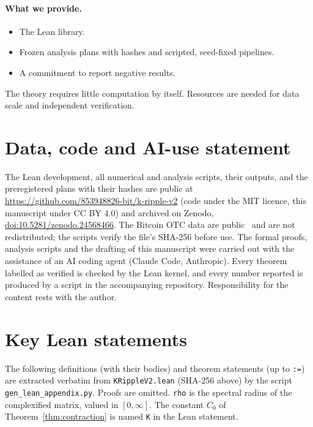 \documentclass[11pt]{article}
\theoremstyle{definition}
\theoremstyle{remark}
\begin{document}
\paragraph{What we provide.}
\begin{itemize}
\item The Lean library.
\item Frozen analysis plans with hashes and scripted, seed-fixed pipelines.
\item A commitment to report negative results.
\end{itemize}
The theory requires little computation by itself. Resources are needed for data scale and independent
verification.

\section*{Data, code and AI-use statement}
The Lean development, all numerical and analysis scripts, their outputs, and the preregistered plans
with their hashes are public at \url{https://github.com/853948826-bit/k-ripple-v2} (code under the MIT
licence, this manuscript under CC BY 4.0) and archived on Zenodo, \href{https://doi.org/10.5281/zenodo.24568466}{doi:10.5281/zenodo.24568466}.
The Bitcoin OTC data are public~\cite{snap} and are not redistributed; the scripts verify the file's
SHA-256 before use. The formal proofs, analysis scripts and the drafting of this
manuscript were carried out with the assistance of an AI coding agent (Claude Code, Anthropic). Every
theorem labelled as verified is checked by the Lean kernel, and every number reported is produced by a
script in the accompanying repository. Responsibility for the content rests with the author.

\appendix
\section{Key Lean statements}\label{app:lean}
The following definitions (with their bodies) and theorem statements (up to \texttt{:=}) are extracted
verbatim from \texttt{KRippleV2.lean} (SHA-256 above) by the script \texttt{gen\_lean\_appendix.py}. Proofs
are omitted. \texttt{rho} is the spectral radius of the complexified matrix, valued in $[0,\infty]$. The
constant $C_0$ of Theorem~\ref{thm:contraction} is named \texttt{K} in the Lean statement.


\end{document}
